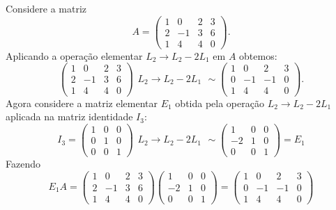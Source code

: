 \begin{exemplo}
    Considere a matriz
    \[
        A = \begin{pmatrix}
            1 & 0 & 2 & 3\\
            2 & -1 & 3 & 6\\
            1 & 4 & 4 & 0
        \end{pmatrix}.
    \]
    Aplicando a operação elementar $L_2 \to L_2 - 2L_1$ em $A$ obtemos:
    \[
        \begin{pmatrix}
            1 & 0 & 2 & 3\\
            2 & -1 & 3 & 6\\
            1 & 4 & 4 & 0
        \end{pmatrix}
        \begin{array}{l}
            \phantom{x}\\L_2 \to L_2 - 2L_1\\\phantom{x}
        \end{array}\sim
        \begin{pmatrix}
            1 & 0 & 2 & 3\\
            0 & -1 & -1 & 0\\
            1 & 4 & 4 & 0
        \end{pmatrix}.
    \]
    Agora considere a matriz elementar $E_1$ obtida pela operação $L_2 \to L_2 - 2L_1$ aplicada na matriz identidade $I_3$:
    \[
        I_3 = \begin{pmatrix}
            1 & 0 & 0\\
            0 & 1 & 0\\
            0 & 0 & 1
        \end{pmatrix}
        \begin{array}{l}
            \phantom{x}\\L_2 \to L_2 - 2L_1\\\phantom{x}
        \end{array}\sim
        \begin{pmatrix}
            1 & 0 & 0\\
            -2 & 1 & 0\\
            0 & 0 & 1
        \end{pmatrix} = E_1
    \]
    Fazendo
    \[
        E_1A = \begin{pmatrix}
            1 & 0 & 2 & 3\\
            2 & -1 & 3 & 6\\
            1 & 4 & 4 & 0
        \end{pmatrix}
        \begin{pmatrix}
            1 & 0 & 0\\
            -2 & 1 & 0\\
            0 & 0 & 1
        \end{pmatrix} = 
        \begin{pmatrix}
            1 & 0 & 2 & 3\\
            0 & -1 & -1 & 0\\
            1 & 4 & 4 & 0
        \end{pmatrix}
    \]
\end{exemplo}

